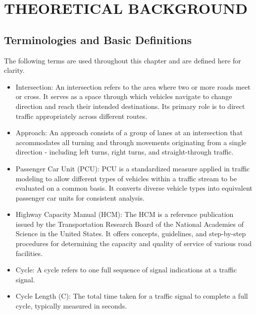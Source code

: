 \chapter{THEORETICAL BACKGROUND}

\section{Terminologies and Basic Definitions}

The following terms are used throughout this chapter 
and are defined here for clarity.

\begin{itemize}
    \item Intersection: An intersection refers to the area 
    where two or more roads meet or cross. It serves as a 
    space through which vehicles navigate to change direction 
    and reach their intended destinations. Its primary role 
    is to direct traffic appropriately across different routes.

    \item Approach: An approach consists of a group of lanes 
    at an intersection that accommodates all turning and 
    through movements originating from a single direction - 
    including left turns, right turns, and straight-through 
    traffic.

    \item Passenger Car Unit (PCU): PCU is a standardized measure 
    applied in traffic modeling to allow different types of 
    vehicles within a traffic stream to be evaluated on a 
    common basis. It converts diverse vehicle types into 
    equivalent passenger car units for consistent analysis.

    \item Highway Capacity Manual (HCM): The HCM is a reference 
    publication issued by the Transportation Research Board 
    of the National Academies of Science in the United States. 
    It offers concepts, guidelines, and step-by-step procedures 
    for determining the capacity and quality of service of various 
    road facilities.

    \item Cycle: A cycle refers to one full sequence of signal 
    indications at a traffic signal.

    \item Cycle Length (C): The total time taken for a 
    traffic signal to complete a full cycle, typically measured 
    in seconds.


\end{itemize}
